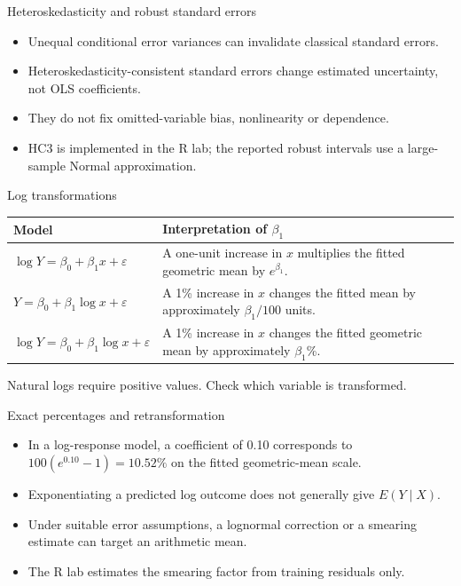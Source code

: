 \begin{frame}{Heteroskedasticity and robust standard errors}
\begin{itemize}
\item Unequal conditional error variances can invalidate classical standard errors.
\item Heteroskedasticity-consistent standard errors change estimated uncertainty, not OLS coefficients.
\item They do not fix omitted-variable bias, nonlinearity or dependence.
\item HC3 is implemented in the R lab; the reported robust intervals use a large-sample Normal approximation.
\end{itemize}
\end{frame}

\begin{frame}{Log transformations}
\begin{center}\begin{tabular}{lp{}}\toprule
Model & Interpretation of $\beta_1$\\\midrule $\log Y=\beta_0+\beta_1x+\varepsilon$ & A one-unit increase in $x$ multiplies the fitted geometric mean by $e^{\beta_1}$.\\ $Y=\beta_0+\beta_1\log x+\varepsilon$ & A 1\% increase in $x$ changes the fitted mean by approximately $\beta_1/100$ units.\\ $\log Y=\beta_0+\beta_1\log x+\varepsilon$ & A 1\% increase in $x$ changes the fitted geometric mean by approximately $\beta_1$\%.\\
\bottomrule\end{tabular}\end{center}Natural logs require positive values. Check which variable is transformed.
\end{frame}

\begin{frame}{Exact percentages and retransformation}
\begin{itemize}
\item In a log-response model, a coefficient of 0.10 corresponds to $100(e^{0.10}-1)=10.52\%$ on the fitted geometric-mean scale.
\item Exponentiating a predicted log outcome does not generally give $E(Y\mid X)$.
\item Under suitable error assumptions, a lognormal correction or a smearing estimate can target an arithmetic mean.
\item The R lab estimates the smearing factor from training residuals only.
\end{itemize}
\end{frame}

